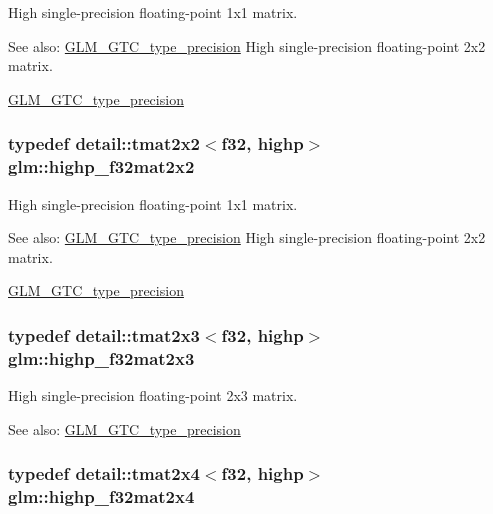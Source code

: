 High single-precision floating-point 1x1 matrix. \begin{Desc}
\item[See also:]\hyperlink{group__gtc__type__precision}{GLM\_\-GTC\_\-type\_\-precision} High single-precision floating-point 2x2 matrix. 

\hyperlink{group__gtc__type__precision}{GLM\_\-GTC\_\-type\_\-precision} \end{Desc}
\hypertarget{group__gtc__type__precision_gf3a2cc948ca6fd168391138ce6fdd100}{
\subsubsection[highp\_\-f32mat2x2]{\setlength{\rightskip}{0pt plus 5cm}typedef detail::tmat2x2$<$f32, highp$>$ {\bf glm::highp\_\-f32mat2x2}}}
\label{group__gtc__type__precision_gf3a2cc948ca6fd168391138ce6fdd100}


High single-precision floating-point 1x1 matrix. \begin{Desc}
\item[See also:]\hyperlink{group__gtc__type__precision}{GLM\_\-GTC\_\-type\_\-precision} High single-precision floating-point 2x2 matrix. 

\hyperlink{group__gtc__type__precision}{GLM\_\-GTC\_\-type\_\-precision} \end{Desc}
\hypertarget{group__gtc__type__precision_g53613c1b93f81207065a8a935ff02a81}{
\subsubsection[highp\_\-f32mat2x3]{\setlength{\rightskip}{0pt plus 5cm}typedef detail::tmat2x3$<$f32, highp$>$ {\bf glm::highp\_\-f32mat2x3}}}
\label{group__gtc__type__precision_g53613c1b93f81207065a8a935ff02a81}


High single-precision floating-point 2x3 matrix. \begin{Desc}
\item[See also:]\hyperlink{group__gtc__type__precision}{GLM\_\-GTC\_\-type\_\-precision} \end{Desc}
\hypertarget{group__gtc__type__precision_g9689dbe21bc976ca8069c63300b5887e}{
\subsubsection[highp\_\-f32mat2x4]{\setlength{\rightskip}{0pt plus 5cm}typedef detail::tmat2x4$<$f32, highp$>$ {\bf glm::highp\_\-f32mat2x4}}}
\label{group__gtc__type__precision_g9689dbe21bc976ca8069c63300b5887e}



